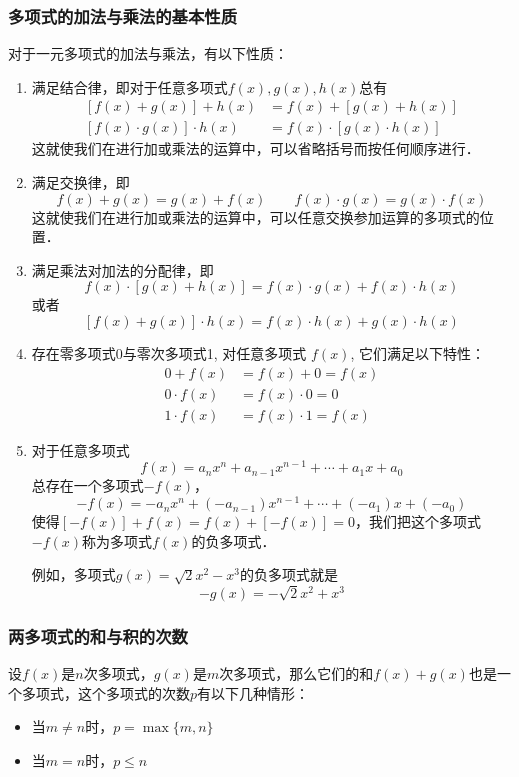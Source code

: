 \subsubsection{多项式的加法与乘法的基本性质}

对于一元多项式的加法与乘法，有以下性质：
\begin{enumerate}
    \item 满足结合律，即对于任意多项式$f(x),g(x),h(x)$总有
\[\begin{split}
   [ f (x) +g (x) ] +h (x) &=f (x) +[g (x) +h (x) ]\\
    [f (x) \cdot g (x) ] \cdot h (x) &=f (x) \cdot [g (x) \cdot h (x) ]
\end{split}\]    
这就使我们在进行加或乘法的运算中，可以省略括号而按任何顺序进行．

\item 满足交换律，即
\[f (x) +g (x) =g (x) +f(x)\qquad f (x) \cdot g (x) =g (x) \cdot f (x) \]
这就使我们在进行加或乘法的运算中，可以任意交换参加运算的多项式的位置．
\item 满足乘法对加法的分配律，即
\[f (x) \cdot  [g (x) +h (x) ] =f (x) \cdot g (x) +f(x)\cdot h(x)\]
或者 \[[f(x)+g(x)]\cdot h(x) =f(x)\cdot h(x) +g(x)\cdot h(x)\]
\item 存在零多项式0与零次多项式1, 对任意多项式
$f(x)$, 它们满足以下特性：
\[\begin{split}
    0+f (x) &=f (x) +0=f (x) \\
    0\cdot f (x) &=f (x) \cdot 0=0\\
    1\cdot f (x) &=f (x) \cdot 1=f (x)
\end{split}\]
\item 对于任意多项式
\[f(x)=a_nx^n+a_{n-1}x^{n-1}+\cdots+a_1x+a_0\]
总存在一个多项式$-f(x)$，
\[-f(x)=-a_nx^n+(-a_{n-1})x^{n-1}+\cdots+(-a_1)x+(-a_0)\]
使得$[-f(x)]+f(x)=f(x)+[-f(x)]=0$，我们把这个多项式$-f(x)$称为多项式$f(x)$的负多项式．

例如，多项式$g(x)=\sqrt{2}x^2-x^3$的负多项式就是
\[-g(x)=-\sqrt{2}x^2+x^3\]
\end{enumerate}

\subsubsection{两多项式的和与积的次数}

设$f(x)$是$n$次多项式，$g(x)$是$m$次多项式，那么它们的和$f(x)+g(x)$也是一个多项式，这个多项式的次数$p$有以下几种情形：
\begin{itemize}
    \item 当$m\ne n$时，$p=\max\{m,n\}$
    \item 当$m=n$时，$p\le n$
\end{itemize}

